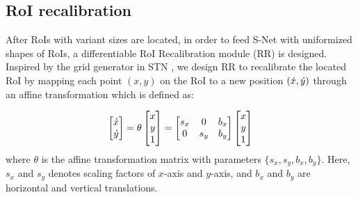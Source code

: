 \documentclass{article}
\begin{document}
\subsection{RoI recalibration}
\vspace{-5pt}

After RoIs with variant sizes are located, in order to feed S-Net with uniformized shapes of RoIs, a differentiable RoI Recalibration module (RR) is designed. Inspired by the grid generator in STN \cite{STN}, we design RR to recalibrate the located RoI by mapping each point $(x,y)$ on the RoI to a new position $(\Acute{x},\Acute{y})$ through an affine transformation which is defined as:
\vspace{-5pt}

\begin{equation}
    \left[
    \begin{matrix}
    \Acute{x} \\ \Acute{y}
    \end{matrix}
    \right]
     = 
    \theta
    \left[
    \begin{matrix}
    x \\ y \\ 1
    \end{matrix}
    \right]
    =
\left[
    \begin{matrix}
    s_x & 0 & b_x \\
    0 & s_y & b_y 
    \end{matrix}
\right]
\left[
\begin{matrix}
x \\ y \\ 1
\end{matrix}
\right]
\end{equation}
where $\theta$ is the affine transformation matrix with parameters $\{s_x, s_y, b_x, b_y\}$. Here, $s_x$ and $s_y$ denotes scaling factors of $x$-axis and $y$-axis, and $b_x$ and $b_y$ are horizontal and vertical translations. 
\end{document}
